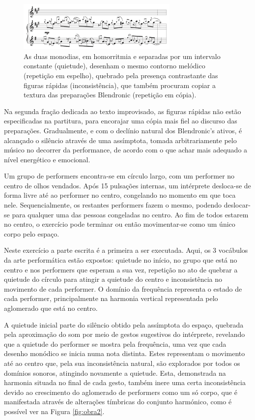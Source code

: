 \documentclass[../main.tex]{subfiles}
\begin{document}
\begin{figure}[h]
    \centering
    \captionsetup{width=0.8\textwidth}
    \includegraphics[width=0.7\textwidth]{images/obra1.png}
    \caption{As duas monodias, em homorritmia e separadas por um intervalo constante (quietude), desenham o mesmo contorno melódico (repetição em espelho), quebrado pela presença contrastante das figuras rápidas (inconsistência), que também procuram copiar a textura das preparações Blendronic (repetição em cópia).}
    \label{fig:obra1}
\end{figure}

Na segunda fração dedicada ao texto improvisado, as figuras rápidas não estão especificadas na partitura, para encorajar uma cópia mais fiel ao discurso das preparações. Gradualmente, e com o declínio natural dos Blendronic's ativos, é alcançado o silêncio através de uma assímptota, tomada arbitrariamente pelo músico no decorrer da performance, de acordo com o que achar mais adequado a nível energético e emocional.

\begin{performex}
    Um grupo de performers encontra-se em círculo largo, com um performer no centro de olhos vendados. Após 15 pulsações internas, um intérprete desloca-se de forma livre até ao performer no centro, congelando no momento em que toca nele. Sequencialmente, os restantes performers fazem o mesmo, podendo deslocar-se para qualquer uma das pessoas congeladas no centro. Ao fim de todos estarem no centro, o exercício pode terminar ou então movimentar-se como um único corpo pelo espaço.
\end{performex}

Neste exercício a parte escrita é a primeira a ser executada. Aqui, os 3 vocábulos da arte performática estão expostos: quietude no início, no grupo que está no centro e nos performers que esperam a sua vez, repetição no ato de quebrar a quietude do círculo para atingir a quietude do centro e inconsistência no movimento de cada performer. O domínio da frequência representa o estado de cada performer, principalmente na harmonia vertical representada pelo aglomerado que está no centro. 

A quietude inicial parte do silêncio obtido pela assímptota do espaço, quebrada pela aproximação do som por meio de gestos sugestivos do intérprete, revelando que a quietude do performer se mostra pela frequência, uma vez que cada desenho monódico se inicia numa nota distinta. Estes representam o movimento até ao centro que, pela sua inconsistência natural, são explorados por todos os domínios sonoros, atingindo novamente a quietude. Esta, demonstrada na harmonia situada no final de cada gesto, também inere uma certa inconsistência devido ao crescimento do aglomerado de performers como um só corpo, que é manifestada através de alterações tímbricas do conjunto harmónico, como é possível ver na Figura \ref{fig:obra2}.
\end{document}
